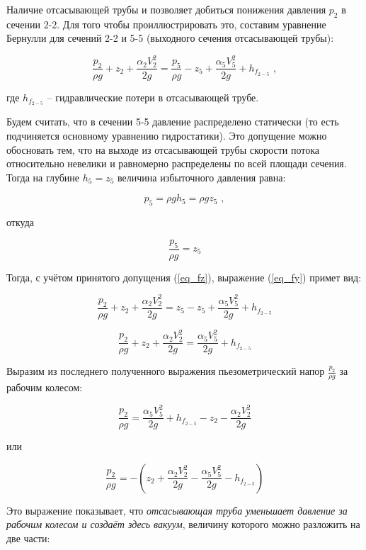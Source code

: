 Наличие отсасывающей трубы и позволяет добиться понижения давления $p_2$ в сечении 2-2. Для того чтобы проиллюстрировать это, составим уравнение Бернулли для сечений 2-2 и 5-5 (выходного сечения отсасывающей трубы):

\begin{equation}
\label{eq_fy}
   \frac{p_2}{\rho g} + z_2 + \frac{\alpha_2 V_2^2 }{2 g} = \frac{p_5}{\rho g} - z_5 + \frac{\alpha_5 V_5^2 }{2 g} + h_{f_{2-5}} \, \, ,
\end{equation}

где $h_{f_{2-5}}$ -- гидравлические потери в отсасывающей трубе.

\vspace{0.5 cm}


Будем считать, что в сечении 5-5 давление распределено статически (то есть подчиняется основному уравнению гидростатики). Это допущение можно обосновать тем, что на выходе из отсасывающей трубы скорости потока относительно невелики и равномерно распределены по всей площади сечения. Тогда на глубине $h_5 = z_5$ величина избыточного давления равна:

$$
   p_5 = \rho g h_5 =  \rho g z_5 \, \, ,
$$

откуда

\begin{equation}
\label{eq_fz}
   \frac{p_5}{\rho g} = z_5
\end{equation}


Тогда, с учётом принятого допущения (\ref{eq_fz}), выражение (\ref{eq_fy}) примет вид:

$$
   \frac{p_2}{\rho g} + z_2 + \frac{\alpha_2 V_2^2 }{2 g} = z_5 - z_5 + \frac{\alpha_5 V_5^2 }{2 g} + h_{f_{2-5}}
$$

$$
   \frac{p_2}{\rho g} + z_2 + \frac{\alpha_2 V_2^2 }{2 g} = \frac{\alpha_5 V_5^2 }{2 g} + h_{f_{2-5}}
$$

Выразим из последнего полученного выражения пьезометрический напор $\frac{p_2}{\rho g}$ за рабочим колесом:

\begin{equation}
\label{eq_fzb}
   \frac{p_2}{\rho g} = \frac{\alpha_5 V_5^2 }{2 g} + h_{f_{2-5}} - z_2 - \frac{\alpha_2 V_2^2 }{2 g}
\end{equation}

или

$$
   \frac{p_2}{\rho g} = - \left( z_2 + \frac{\alpha_2 V_2^2 }{2 g} - \frac{\alpha_5 V_5^2 }{2 g} - h_{f_{2-5}} \right)
$$

Это выражение показывает, что {\color{red}\textit{отсасывающая труба уменьшает давление за рабочим колесом и создаёт здесь вакуум}}, величину которого можно разложить на две части:

